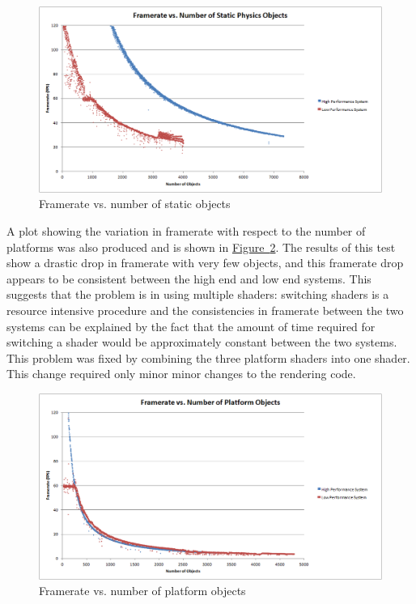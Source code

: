 \documentclass[12pt, titlepage]{article}
\begin{document}
\begin{figure}[htb]
\centering
\includegraphics[width=\textwidth]{frameratestatic}
\caption{Framerate vs. number of static objects} \label{fig:frstat}
\end{figure}

\FloatBarrier

A plot showing the variation in framerate with respect to the number of platforms was also produced and is shown in \hyperref[fig:frplat]{Figure~\ref*{fig:frplat}}.  The results of this test show a drastic drop in framerate with very few objects, and this framerate drop appears to be consistent between the high end and low end systems.  This suggests that the problem is in using multiple shaders:  switching shaders is a resource intensive procedure and the consistencies in framerate between the two systems can be explained by the fact that the amount of time required for switching a shader would be approximately constant between the two systems.  This problem was fixed by combining the three platform shaders into one shader.  This change required only minor minor changes to the rendering code.




\begin{figure}[htb]
\centering
\includegraphics[width=\textwidth]{framerateplat}
\caption{Framerate vs. number of platform objects} \label{fig:frplat}
\end{figure}
\FloatBarrier
\end{document}

